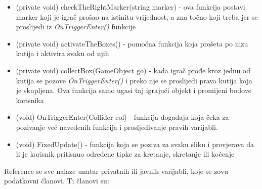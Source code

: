 \begin{itemize}
	\item (private void) checkTheRightMarker(string marker) - ova funkcija postavi marker koji je igrač prošao na istinitu vrijednost, a zna točno koji treba jer se proslijedi iz \emph{OnTriggerEnter()} funkcije
	\item (private void) activateTheBoxes() - pomoćna funkcija koja prošeta po nizu kutija i aktivira svaku od njih
	\item (private void) collectBox(GameObject go) - kada igrač prođe kroz jednu od kutija se pozove \emph{OnTriggerEnter()} i preko nje se proslijedi prava kutija koja je skupljena. Ova funkcija samo ugasi taj igrajući objekt i promijeni bodove korisnika
	\item (void) OnTriggerEnter(Collider col) - funkcija događaja koja čeka za pozivanje već navedenih funkcija i prosljeđivanje pravih varijabli.
	\item (void) FixedUpdate() - funkcija koja se poziva za svaku sliku i provjerava da li je korisnik pritisnuo određene tipke za kretanje, skretanje ili kočenje
\end{itemize}
Reference se sve nalaze unutar privatnih ili javnih varijabli, koje se zovu podatkovni članovi. Ti članovi su:
